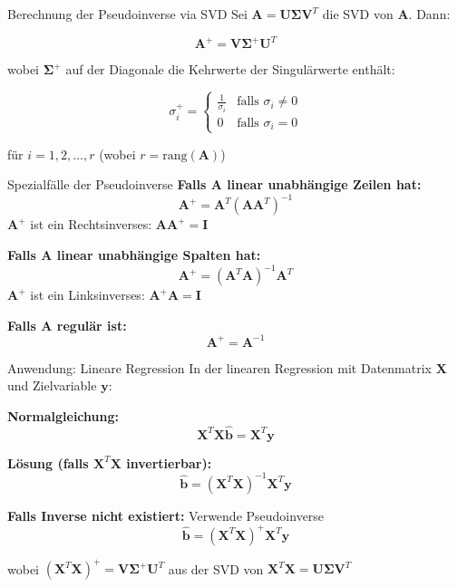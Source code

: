 \documentclass[a4paper, fontsize=7pt]{scrartcl}
\begin{document}
\begin{mainbox}{Berechnung der Pseudoinverse via SVD}
Sei $\mathbf{A} = \mathbf{U\Sigma V}^T$ die SVD von $\mathbf{A}$. Dann:

$$\mathbf{A}^+ = \mathbf{V\Sigma}^+\mathbf{U}^T$$

wobei $\mathbf{\Sigma}^+$ auf der Diagonale die Kehrwerte der Singulärwerte enthält:

$$\sigma_i^+ = \begin{cases}
\frac{1}{\sigma_i} & \text{falls } \sigma_i \neq 0 \\
0 & \text{falls } \sigma_i = 0
\end{cases}$$

für $i = 1, 2, \ldots, r$ (wobei $r = \text{rang}(\mathbf{A})$)
\end{mainbox}

\begin{mainbox}{Spezialfälle der Pseudoinverse}
\textbf{Falls $\mathbf{A}$ linear unabhängige Zeilen hat:}
$$\mathbf{A}^+ = \mathbf{A}^T(\mathbf{AA}^T)^{-1}$$
$\mathbf{A}^+$ ist ein Rechtsinverses: $\mathbf{AA}^+ = \mathbf{I}$

\textbf{Falls $\mathbf{A}$ linear unabhängige Spalten hat:}
$$\mathbf{A}^+ = (\mathbf{A}^T\mathbf{A})^{-1}\mathbf{A}^T$$
$\mathbf{A}^+$ ist ein Linksinverses: $\mathbf{A}^+\mathbf{A} = \mathbf{I}$

\textbf{Falls $\mathbf{A}$ regulär ist:}
$$\mathbf{A}^+ = \mathbf{A}^{-1}$$
\end{mainbox}

\begin{subbox}{Anwendung: Lineare Regression}
In der linearen Regression mit Datenmatrix $\mathbf{X}$ und Zielvariable $\mathbf{y}$:

\textbf{Normalgleichung:}
$$\mathbf{X}^T\mathbf{X}\hat{\mathbf{b}} = \mathbf{X}^T\mathbf{y}$$

\textbf{Lösung (falls $\mathbf{X}^T\mathbf{X}$ invertierbar):}
$$\hat{\mathbf{b}} = (\mathbf{X}^T\mathbf{X})^{-1}\mathbf{X}^T\mathbf{y}$$

\textbf{Falls Inverse nicht existiert:} Verwende Pseudoinverse
$$\hat{\mathbf{b}} = (\mathbf{X}^T\mathbf{X})^+\mathbf{X}^T\mathbf{y}$$

wobei $(\mathbf{X}^T\mathbf{X})^+ = \mathbf{V\Sigma}^+\mathbf{U}^T$ aus der SVD von $\mathbf{X}^T\mathbf{X} = \mathbf{U\Sigma V}^T$
\end{subbox}
\end{document}
